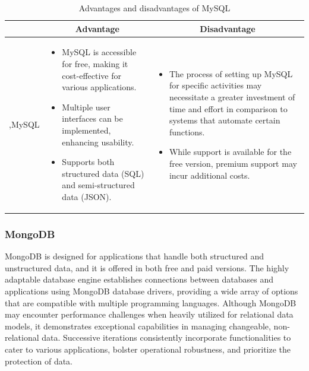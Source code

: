 \begin{table}[H]
    \centering
    \begin{tabular}{| c | p{} | p{} |}
        \hline
        \multicolumn{1}{|c|}{}
        & \multicolumn{1}{c|}{Advantage}
        & \multicolumn{1}{c|}{Disadvantage} \\ \hline
        \multirow{7}{*}{,MySQL}     
                &   \begin{itemize}[leftmargin=*,topsep=0pt,partopsep=0pt,parsep=0pt]
                        \item MySQL is accessible for free, making it cost-effective for various applications.
                        \item Multiple user interfaces can be implemented, enhancing usability.
                        \item Supports both structured data (SQL) and semi-structured data (JSON).
                    \end{itemize}
                &   \begin{itemize}[leftmargin=*,topsep=0pt,partopsep=0pt,parsep=0pt]
                        \item The process of setting up MySQL for specific activities may necessitate a greater investment of time and effort in comparison to systems that automate certain functions.
                        \item While support is available for the free version, premium support may incur additional costs.
                    \end{itemize} \\ \hline
    \end{tabular}
    \caption{Advantages and disadvantages of MySQL}
\end{table}

\subsubsection{MongoDB}

MongoDB is designed for applications that handle both structured and unstructured data, and it is offered in both free and paid versions. The highly adaptable database engine establishes connections between databases and applications using MongoDB database drivers, providing a wide array of options that are compatible with multiple programming languages. Although MongoDB may encounter performance challenges when heavily utilized for relational data models, it demonstrates exceptional capabilities in managing changeable, non-relational data. Successive iterations consistently incorporate functionalities to cater to various applications, bolster operational robustness, and prioritize the protection of data.


